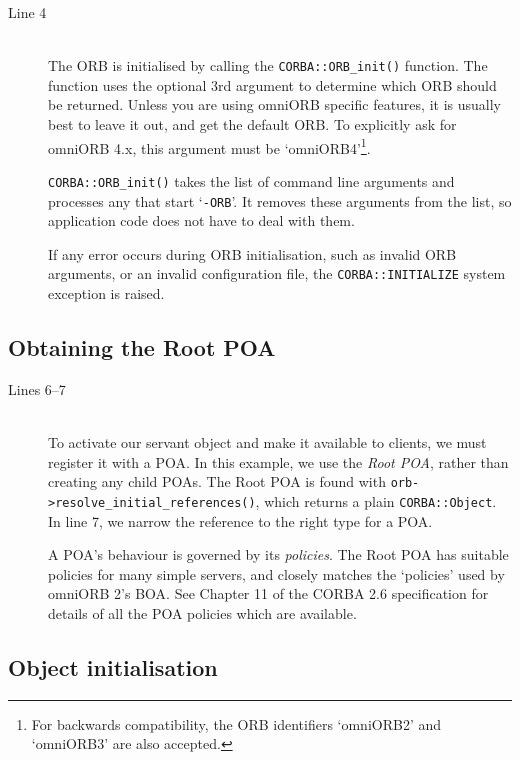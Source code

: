 \documentclass[11pt,twoside,a4paper]{book}
\newcommand{\type}[1]{\texttt{#1}}
\newcommand{\code}[1]{\texttt{#1}}
\newcommand{\op}[1]{\texttt{#1()}}
\newcommand{\term}[1]{\textit{#1}}
\newcommand{\dsc}{\discretionary{}{}{}}
\begin{document}
\begin{description}

\item[Line 4]\mbox{}\\
%
The ORB is initialised by calling the \op{CORBA::ORB\_init}
function. The function uses the optional 3rd argument to determine
which ORB should be returned. Unless you are using omniORB specific
features, it is usually best to leave it out, and get the default
ORB. To explicitly ask for omniORB 4.x, this argument must be
`omniORB4'\footnote{For backwards compatibility, the ORB identifiers
`omniORB2' and `omniORB3' are also accepted.}.

\op{CORBA::ORB\_init} takes the list of command line arguments and
processes any that start `\code{-ORB}'. It removes these arguments
from the list, so application code does not have to deal with them.

If any error occurs during ORB initialisation, such as invalid ORB
arguments, or an invalid configuration file, the
\code{CORBA::INITIALIZE} system exception is raised.

\end{description}


\subsection{Obtaining the Root POA}

\begin{description}

\item[Lines 6--7]\mbox{}\\
%
To activate our servant object and make it available to clients, we
must register it with a POA. In this example, we use the \term{Root
POA}, rather than creating any child POAs. The Root POA is found with
\op{orb->resolve\_initial\_\dsc{}references}, which returns a plain
\type{CORBA::Object}. In line 7, we narrow the reference to the right
type for a POA.

A POA's behaviour is governed by its \term{policies}. The Root POA has
suitable policies for many simple servers, and closely matches the
`policies' used by omniORB 2's BOA. See Chapter 11 of the CORBA 2.6
specification\cite{corba26-spec} for details of all the POA policies
which are available.

\end{description}


\subsection{Object initialisation}
\end{document}
